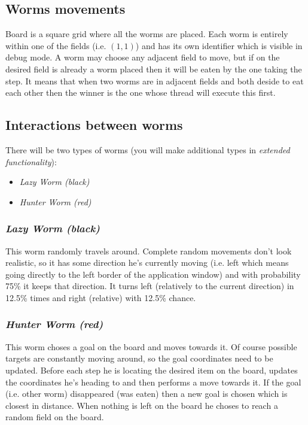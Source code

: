 \documentclass{article}
\begin{document}
\subsection{Worms movements}

Board is a square grid where all the worms are placed. Each worm is entirely
within one of the fields (i.e. $(1,1)$) and has its own identifier which
is visible in debug mode. A worm may choose any adjacent field to move,
but if on the desired field is already a worm placed then it will be eaten
by the one taking the step. It means that when two worms are in adjacent
fields and both deside to eat each other then the winner is the one whose
thread will execute this first.

\subsection{Interactions between worms}

There will be two types of worms (you will make additional types in
\textit{extended functionality}):
\begin{itemize}
  \item \textit{Lazy Worm (black)}
  \item \textit{Hunter Worm (red)}
\end{itemize}

\subsubsection{\textit{Lazy Worm (black)}}

This worm randomly travels around. Complete random movements don't look
realistic, so it has some direction he's currently moving
(i.e. left which means going directly to the left border of the application window)
and with probability 75\% it keeps that direction. It turns left (relatively
to the current direction) in 12.5\% times and right (relative) with 12.5\% chance.

\subsubsection{\textit{Hunter Worm (red)}}

This worm choses a goal on the board and moves towards it. Of course possible
targets are constantly moving around, so the goal coordinates need to be updated.
Before each step he is locating the desired item on the board, updates the
coordinates he's heading to and then performs a move towards it. If the goal
(i.e. other worm) disappeared (was eaten) then a new goal is chosen which is
closest in distance. When nothing is left on the board he choses to reach
a random field on the board.
\end{document}
